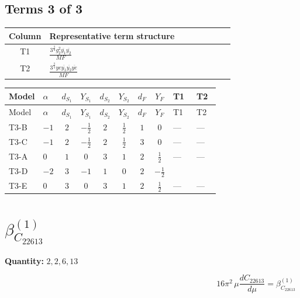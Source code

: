 \documentclass[8pt]{article}
\begin{document}
\begin{landscape}
\subsection*{Terms 3 of 3}
\begin{center}
\begin{tabular}{@{}c >{\raggedright\arraybackslash}p{0.82\linewidth}@{}}
\toprule
Column & Representative term structure \\
\midrule
T1 & \(\displaystyle \frac{3^{\frac{3}{4}} g_{2}^{2} \overline{y_{1}} \overline{y_{2}}}{MF}\) \\
\midrule
T2 & \(\displaystyle \frac{3^{\frac{3}{4}} ye \overline{y_{1}} \overline{y_{2}} \overline{ye}}{MF}\) \\
\midrule
\bottomrule
\end{tabular}
\end{center}
\smallskip
\tiny
\begin{longtable}{@{}llcccccc >{\raggedright\arraybackslash}p{0.21\linewidth} >{\raggedright\arraybackslash}p{0.21\linewidth}@{}}
\toprule
Model & $\alpha$ & $d_{S_1}$ & $Y_{S_1}$ & $d_{S_2}$ & $Y_{S_2}$ & $d_F$ & $Y_F$ & T1 & T2 \\
\midrule
\endfirsthead
\toprule
Model & $\alpha$ & $d_{S_1}$ & $Y_{S_1}$ & $d_{S_2}$ & $Y_{S_2}$ & $d_F$ & $Y_F$ & T1 & T2 \\
\midrule
\endhead
T3-B & $-1$ & $2$ & $-\frac{1}{2}$ & $2$ & $\frac{1}{2}$ & $1$ & $0$ & --- & --- \\
\midrule
T3-C & $-1$ & $2$ & $-\frac{1}{2}$ & $2$ & $\frac{1}{2}$ & $3$ & $0$ & --- & --- \\
\midrule
T3-A & $0$ & $1$ & $0$ & $3$ & $1$ & $2$ & $\frac{1}{2}$ & --- & --- \\
\midrule
T3-D & $-2$ & $3$ & $-1$ & $1$ & $0$ & $2$ & $-\frac{1}{2}$ & \scriptsize\adjustbox{max width=\linewidth}{$\begin{gathered} \frac{11 \cdot 3^{\frac{3}{4}} g_{2}^{2} \overline{y_{1}} \overline{y_{2}}}{8 MF}\end{gathered}$} & \scriptsize\adjustbox{max width=\linewidth}{$\begin{gathered} - \frac{3^{\frac{3}{4}} ye \overline{y_{1}} \overline{y_{2}} \overline{ye}}{12 MF}\end{gathered}$} \\
\midrule
T3-E & $0$ & $3$ & $0$ & $3$ & $1$ & $2$ & $\frac{1}{2}$ & --- & --- \\
\midrule
\bottomrule
\end{longtable}
\clearpage
\section*{$\beta_{C_{22613}}^{(1)}$}
\noindent\textbf{Quantity: }$\mathrm{2,2,6,13}$\par\smallskip
\[16\pi^2\,\mu\frac{d C_{22613}}{d\mu}=\beta_{C_{22613}}^{(1)}\]

\end{landscape}
\end{document}
